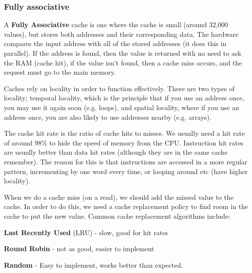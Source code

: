 \subsubsection{Fully associative}

A \textbf{Fully Associative} cache is one where the cache is small (around
32,000 values), but stores both addresses and their corresponding data. The
hardware compares the input address with all of the stored addresses (it does
this in parallel). If the address is found, then the value is returned with no
need to ask the RAM (cache hit), if the value isn't found, then a cache miss
occurs, and the request must go to the main memory.

Caches rely on locality in order to function effectively. There are two types of
locality; temporal locality, which is the principle that if you use an address
once, you may use it again soon (e.g. loops), and spatial locality, where if you
use an address once, you are also likely to use addresses nearby (e.g. arrays).


The cache hit rate is the ratio of cache hits to misses. We usually need a hit
rate of around $98\%$ to hide the speed of memory from the CPU. Instruction hit
rates are usually better than data hit rates (although they are in the same
cache remember). The reason for this is that instructions are accessed in a more
regular pattern, incrementing by one word every time, or looping around etc
(have higher locality).

When we do a cache miss (on a read), we should add the missed value to the
cache. In order to do this, we need a cache replacement policy to find room in
the cache to put the new value. Common cache replacement algorithms include:


\begin{description}
	\item \textbf{Last Recently Used} (LRU) - slow, good for hit rates
	\item \textbf{Round Robin} - not as good, easier to implement
	\item \textbf{Random} - Easy to implement, works better than expected.
\end{description}

